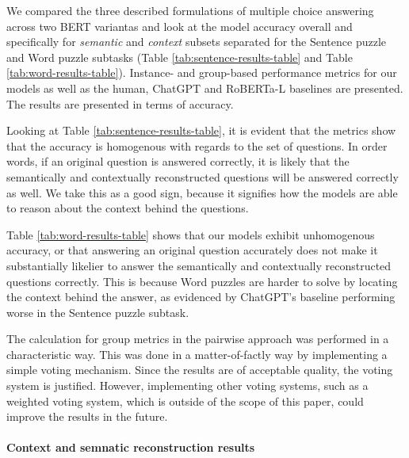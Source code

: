 We compared the three described formulations of multiple choice answering across two BERT variantas and look at the model accuracy overall and specifically for \emph{semantic} and \emph{context} subsets separated for the Sentence puzzle and Word puzzle subtasks (Table \ref{tab:sentence-results-table} and Table \ref{tab:word-results-table}). 
Instance- and group-based performance metrics for our models as well as the human, ChatGPT and RoBERTa-L baselines are presented.
The results are presented in terms of accuracy.

Looking at Table \ref{tab:sentence-results-table}, it is evident that the metrics show that the accuracy is homogenous with regards to the set of questions.
In order words, if an original question is answered correctly, it is likely that the semantically and contextually reconstructed questions will be answered correctly as well.
We take this as a good sign, because it signifies how the models are able to reason about the context behind the questions.

Table \ref{tab:word-results-table} shows that our models exhibit unhomogenous accuracy, or that answering an original question accurately does not make it substantially likelier to answer the semantically and contextually reconstructed questions correctly.
This is because Word puzzles are harder to solve by locating the context behind the answer, as evidenced by ChatGPT's baseline performing worse in the Sentence puzzle subtask.

The calculation for group metrics in the pairwise approach was performed in a characteristic way.
This was done in a matter-of-factly way by implementing a simple voting mechanism.
Since the results are of acceptable quality, the voting system is justified.
However, implementing other voting systems, such as a weighted voting system, which is outside of the scope of this paper, could improve the results in the future.

\paragraph{Context and semnatic reconstruction results} \


